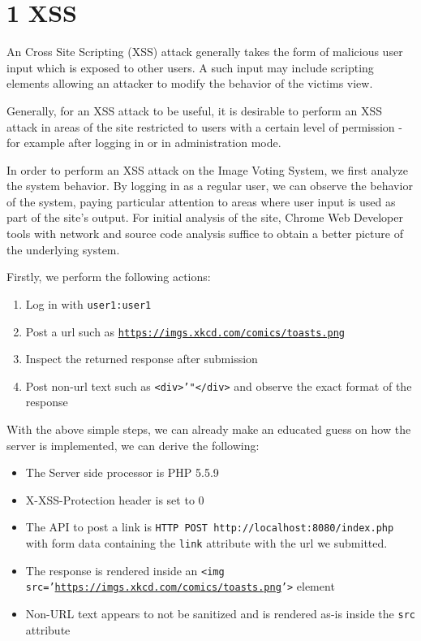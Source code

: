 \documentclass[a4paper, 12pt]{article}
\begin{document}
\section*{1 XSS}
An Cross Site Scripting (XSS) attack generally takes the form of malicious user input which is exposed to other users. A such input may include scripting elements allowing an attacker to modify the behavior of the victims view. 

Generally, for an XSS attack to be useful, it is desirable to perform an XSS attack in areas of the site restricted to users with a certain level of permission - for example after logging in or in administration mode.

In order to perform an XSS attack on the Image Voting System, we first analyze the system behavior. By logging in as a regular user, we can observe the behavior of the system, paying particular attention to areas where user input is used as part of the site's output. For initial analysis of the site, Chrome Web Developer tools with network and source code analysis suffice to obtain a better picture of the underlying system.

Firstly, we perform the following actions:
\begin{enumerate}
	\item Log in with \texttt{user1:user1}
    \item Post a url such as \texttt{\url{https://imgs.xkcd.com/comics/toasts.png}}
    \item Inspect the returned response after submission
    \item Post non-url text such as \texttt{<div>'"</div>} and observe the exact format of the response
\end{enumerate}

With the above simple steps, we can already make an educated guess on how the server is implemented, we can derive the following:

\begin{itemize}
	\item The Server side processor is PHP 5.5.9
    \item X-XSS-Protection header is set to 0
    \item The API to post a link is \texttt{HTTP POST http://localhost:8080/index.php} with form data containing the \texttt{link} attribute with the url we submitted.
    \item The response is rendered inside an \texttt{<img src='\url{https://imgs.xkcd.com/comics/toasts.png}'>} element
    \item Non-URL text appears to not be sanitized and is rendered as-is inside the \texttt{src} attribute
\end{itemize}
\end{document}
